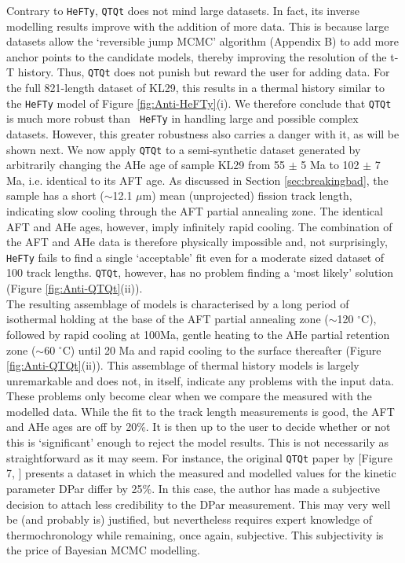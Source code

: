 \documentclass{article}
\begin{document}
Contrary to {\tt HeFTy}, {\tt QTQt} does not mind large datasets. In
fact, its inverse modelling results improve with the addition of more
data. This is because large datasets allow the `reversible jump MCMC'
algorithm (Appendix B) to add more anchor points to the candidate
models, thereby improving the resolution of the t-T history. Thus,
{\tt QTQt} does not punish but reward the user for adding data. For
the full 821-length dataset of KL29, this results in a thermal history
similar to the {\tt HeFTy} model of Figure \ref{fig:Anti-HeFTy}(i). We
therefore conclude that {\tt QTQt} is much more robust than {\tt
  HeFTy} in handling large and possible complex datasets. However,
this greater robustness also carries a danger with it, as will be
shown next. We now apply {\tt QTQt} to a semi-synthetic dataset
generated by arbitrarily changing the AHe age of sample KL29 from 55
$\pm$ 5 Ma to 102 $\pm$ 7 Ma, i.e. identical to its AFT age.  As
discussed in Section \ref{sec:breakingbad}, the sample has a short
($\sim$12.1 $\mu$m) mean (unprojected) fission track length,
indicating slow cooling through the AFT partial annealing zone.  The
identical AFT and AHe ages, however, imply infinitely rapid cooling.
The combination of the AFT and AHe data is therefore physically
impossible and, not surprisingly, {\tt HeFTy} fails to find a single
`acceptable' fit even for a moderate sized dataset of 100 track
lengths.  {\tt QTQt}, however, has no problem finding a `most likely'
solution (Figure \ref{fig:Anti-QTQt}(ii)).\\

The resulting assemblage of models is characterised by a long period
of isothermal holding at the base of the AFT partial annealing zone
($\sim$120 $^{\circ}$C), followed by rapid cooling at 100Ma, gentle
heating to the AHe partial retention zone ($\sim$60 $^{\circ}$C) until
20 Ma and rapid cooling to the surface thereafter (Figure
\ref{fig:Anti-QTQt}(ii)). This assemblage of thermal history models is
largely unremarkable and does not, in itself, indicate any problems
with the input data. These problems only become clear when we compare
the measured with the modelled data. While the fit to the track length
measurements is good, the AFT and AHe ages are off by 20\%. It is then
up to the user to decide whether or not this is `significant' enough
to reject the model results.  This is not necessarily as
straightforward as it may seem.  For instance, the original {\tt QTQt}
paper by [Figure 7, \cite{gallagher2012}] presents a dataset in which
the measured and modelled values for the kinetic parameter DPar differ
by 25\%. In this case, the author has made a subjective decision to
attach less credibility to the DPar measurement. This may very well be
(and probably is) justified, but nevertheless requires expert
knowledge of thermochronology while remaining, once again,
subjective. This subjectivity is the price of Bayesian MCMC modelling.
\end{document}
